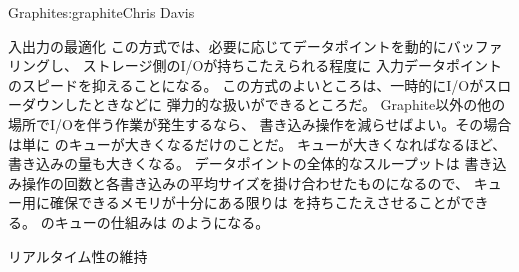 \begin{aosachapter}{Graphite}{s:graphite}{Chris Davis}
\begin{aosasect1}{入出力の最適化}
この方式では、必要に応じてデータポイントを動的にバッファリングし、
ストレージ側のI/Oが持ちこたえられる程度に
入力データポイントのスピードを抑えることになる。
この方式のよいところは、一時的にI/Oがスローダウンしたときなどに
弾力的な扱いができるところだ。
Graphite以外の他の場所でI/Oを伴う作業が発生するなら、
書き込み操作を減らせばよい。その場合は単に
のキューが大きくなるだけのことだ。
キューが大きくなればなるほど、書き込みの量も大きくなる。
データポイントの全体的なスループットは
書き込み操作の回数と各書き込みの平均サイズを掛け合わせたものになるので、
キュー用に確保できるメモリが十分にある限りは
を持ちこたえさせることができる。
のキューの仕組みは
のようになる。


\end{aosasect1}

\begin{aosasect1}{リアルタイム性の維持}


\end{aosasect1}
\end{aosachapter}
